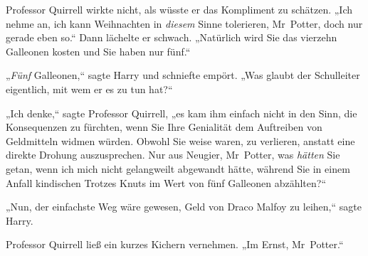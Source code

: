 Professor Quirrell wirkte nicht, als wüsste er das Kompliment zu schätzen. „Ich nehme an, ich kann Weihnachten in \emph{diesem} Sinne tolerieren, Mr~Potter, doch nur gerade eben so.“ Dann lächelte er schwach. „Natürlich wird Sie das vierzehn Galleonen kosten und Sie haben nur fünf.“

„\emph{Fünf} Galleonen,“ sagte Harry und schniefte empört. „Was glaubt der Schulleiter eigentlich, mit wem er es zu tun hat?“

„Ich denke,“ sagte Professor Quirrell, „es kam ihm einfach nicht in den Sinn, die Konsequenzen zu fürchten, wenn Sie Ihre Genialität dem Auftreiben von Geldmitteln widmen würden. Obwohl Sie weise waren, zu verlieren, anstatt eine direkte Drohung auszusprechen. Nur aus Neugier, Mr~Potter, was \emph{hätten} Sie getan, wenn ich mich nicht gelangweilt abgewandt hätte, während Sie in einem Anfall kindischen Trotzes Knuts im Wert von fünf Galleonen abzählten?“

„Nun, der einfachste Weg wäre gewesen, Geld von Draco Malfoy zu leihen,“ sagte Harry.

Professor Quirrell ließ ein kurzes Kichern vernehmen. „Im Ernst, Mr~Potter.“

